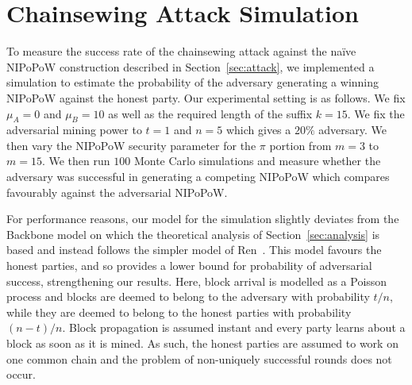\section{Chainsewing Attack Simulation}
\label{sec:simulation}

To measure the success rate of the chainsewing attack against the na\"ive NIPoPoW construction described in Section~\ref{sec:attack}, we implemented a simulation to estimate the probability of the adversary generating a winning NIPoPoW against the honest party. Our experimental setting is as follows. We fix $\mu_A = 0$ and $\mu_B = 10$ as well as the required length of the suffix $k = 15$. We fix the adversarial mining power to $t = 1$ and $n = 5$ which gives a $20\%$ adversary. We then vary the NIPoPoW security parameter for the $\pi$ portion from $m = 3$ to $m = 15$. We then run $100$ Monte Carlo simulations and measure whether the adversary was successful in generating a competing NIPoPoW which compares favourably against the adversarial NIPoPoW.

For performance reasons, our model for the simulation slightly deviates from the Backbone model on which the theoretical analysis of Section~\ref{sec:analysis} is based and instead follows the simpler model of Ren~\cite{nakamoto-simple}. This model favours the honest parties, and so provides a lower bound for probability of adversarial success, strengthening our results. Here, block arrival is modelled as a Poisson process and blocks are deemed to belong to the adversary with probability $t / n$, while they are deemed to belong to the honest parties with probability $(n - t) / n$. Block propagation is assumed instant and every party learns about a block as soon as it is mined. As such, the honest parties are assumed to work on one common chain and the problem of non-uniquely successful rounds does not occur.

